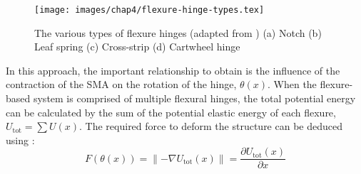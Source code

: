 \begin{figure}[hbt!]
    \centering
    \texttt{[image: images/chap4/flexure-hinge-types.tex]}
    \caption[The various types of flexure hinges]{The various types of flexure hinges (adapted from \cite{wuGeneralizedAnalyticalCompliance2015}) (a) Notch (b) Leaf spring (c) Cross-strip (d) Cartwheel hinge}
    \label{fig:flexure-hinge-types}
\end{figure}


In this approach, the important relationship to obtain is the influence of the contraction of the SMA on the rotation of the hinge, $\theta(x)$. When the flexure-based system is comprised of multiple flexural hinges, the total potential energy can be calculated by the sum of the potential elastic energy of each flexure, $U_\mathrm{tot}=\sum U(x)$. The required force to deform the structure can be deduced using :
\begin{equation}\label{eq:flexure-hinge-force}
    F(\theta(x)) = \lVert -\nabla{U_\text{tot}(x)}\rVert = \frac{\partial U_\text{tot}(x)}{\partial x}
\end{equation}

